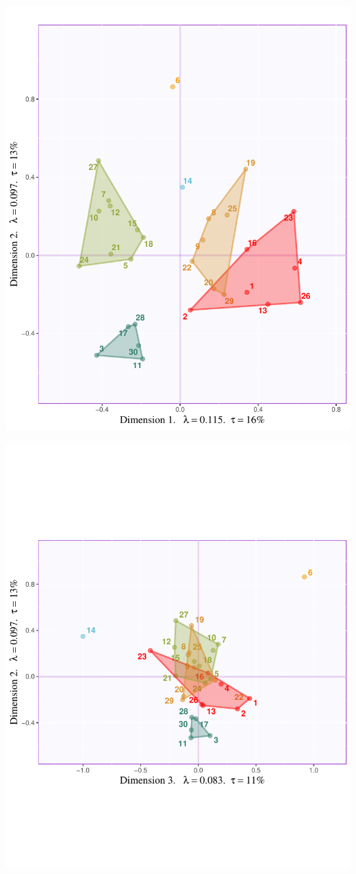 \documentclass[
]{article}
\begin{document}
\begin{center}\includegraphics{MusDes_Supplementary_files/figure-latex/excerptsmaps23-1} \end{center}

\begin{center}\includegraphics{MusDes_Supplementary_files/figure-latex/excerptsmaps23-2} \end{center}
\end{document}
